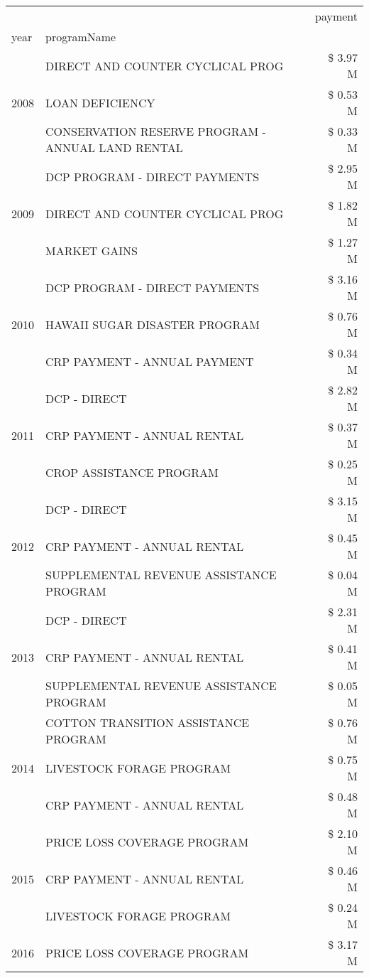 \begin{tabular}{llr}
\toprule
 &  & payment \\
year & programName &  \\
\midrule
\multirow[t]{3}{*}{2008} & DIRECT AND COUNTER CYCLICAL PROG & \$ 3.97 M \\
 & LOAN DEFICIENCY & \$ 0.53 M \\
 & CONSERVATION RESERVE PROGRAM - ANNUAL LAND RENTAL & \$ 0.33 M \\
\cline{1-3}
\multirow[t]{3}{*}{2009} & DCP PROGRAM - DIRECT PAYMENTS & \$ 2.95 M \\
 & DIRECT AND COUNTER CYCLICAL PROG & \$ 1.82 M \\
 & MARKET GAINS & \$ 1.27 M \\
\cline{1-3}
\multirow[t]{3}{*}{2010} & DCP PROGRAM - DIRECT PAYMENTS & \$ 3.16 M \\
 & HAWAII SUGAR DISASTER PROGRAM & \$ 0.76 M \\
 & CRP PAYMENT - ANNUAL PAYMENT & \$ 0.34 M \\
\cline{1-3}
\multirow[t]{3}{*}{2011} & DCP - DIRECT & \$ 2.82 M \\
 & CRP PAYMENT - ANNUAL RENTAL & \$ 0.37 M \\
 & CROP ASSISTANCE PROGRAM & \$ 0.25 M \\
\cline{1-3}
\multirow[t]{3}{*}{2012} & DCP - DIRECT & \$ 3.15 M \\
 & CRP PAYMENT - ANNUAL RENTAL & \$ 0.45 M \\
 & SUPPLEMENTAL REVENUE ASSISTANCE PROGRAM & \$ 0.04 M \\
\cline{1-3}
\multirow[t]{3}{*}{2013} & DCP - DIRECT & \$ 2.31 M \\
 & CRP PAYMENT - ANNUAL RENTAL & \$ 0.41 M \\
 & SUPPLEMENTAL REVENUE ASSISTANCE PROGRAM & \$ 0.05 M \\
\cline{1-3}
\multirow[t]{3}{*}{2014} & COTTON TRANSITION ASSISTANCE PROGRAM & \$ 0.76 M \\
 & LIVESTOCK FORAGE PROGRAM & \$ 0.75 M \\
 & CRP PAYMENT - ANNUAL RENTAL & \$ 0.48 M \\
\cline{1-3}
\multirow[t]{3}{*}{2015} & PRICE LOSS COVERAGE PROGRAM & \$ 2.10 M \\
 & CRP PAYMENT - ANNUAL RENTAL & \$ 0.46 M \\
 & LIVESTOCK FORAGE PROGRAM & \$ 0.24 M \\
\cline{1-3}
\multirow[t]{3}{*}{2016} & PRICE LOSS COVERAGE PROGRAM                   & \$ 3.17 M \\

\end{tabular}
